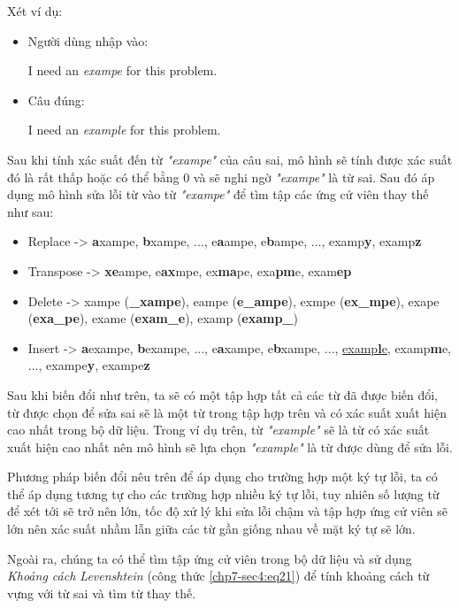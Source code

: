 Xét ví dụ:
\begin{itemize}
    \item Người dùng nhập vào:
    \begin{center}
    I need an \textit{exampe} for this problem.
    \end{center}
    \item Câu đúng:
    \begin{center}
    I need an \textit{example} for this problem.
    \end{center}
\end{itemize}

Sau khi tính xác suất đến từ \textit{"exampe"} của câu sai, mô hình sẽ tính được xác suất đó là rất thấp hoặc có thể bằng 0 và sẽ nghi ngờ \textit{"exampe"} là từ sai. Sau đó áp dụng mô hình sửa lỗi từ vào từ \textit{"exampe"} để tìm tập các ứng cử viên thay thế như sau:
\begin{itemize}
    \item Replace -> \textbf{a}xampe, \textbf{b}xampe, ..., e\textbf{a}ampe, e\textbf{b}ampe, ..., examp\textbf{y}, examp\textbf{z}
    \item Transpose -> \textbf{xe}ampe, e\textbf{ax}mpe, ex\textbf{ma}pe, exa\textbf{pm}e, exam\textbf{ep}
    \item Delete -> xampe (\textbf{\_xampe}), eampe (\textbf{e\_ampe}), exmpe (\textbf{ex\_mpe}), exape (\textbf{exa\_pe}), exame (\textbf{exam\_e}), examp (\textbf{examp\_})
    \item Insert -> \textbf{a}exampe, \textbf{b}exampe, ..., e\textbf{a}xampe, e\textbf{b}xampe, ..., \underline{examp\textbf{l}e}, examp\textbf{m}e, ..., exampe\textbf{y}, exampe\textbf{z}
\end{itemize}

Sau khi biến đổi như trên, ta sẽ có một tập hợp tất cả các từ đã được biến đổi, từ được chọn để sửa sai sẽ là một từ trong tập hợp trên và có xác suất xuất hiện cao nhất trong bộ dữ liệu. Trong ví dụ trên, từ \textit{"example"} sẽ là từ có xác suất xuất hiện cao nhất nên mô hình sẽ lựa chọn \textit{"example"} là từ được dùng để sửa lỗi.

Phương pháp biến đổi nêu trên để áp dụng cho trường hợp một ký tự lỗi, ta có thể áp dụng tương tự cho các trường hợp nhiều ký tự lỗi, tuy nhiên số lượng từ để xét tới sẽ trở nên lớn, tốc độ xử lý khi sửa lỗi chậm và tập hợp ứng cử viên sẽ lớn nên xác suất nhầm lẫn giữa các từ gần giống nhau về mặt ký tự sẽ lớn.

Ngoài ra, chúng ta có thể tìm tập ứng cử viên trong bộ dữ liệu và sử dụng \textit{Khoảng cách Levenshtein} (công thức \ref{chp7-sec4:eq21}) để tính khoảng cách từ vựng với từ sai và tìm từ thay thế.
